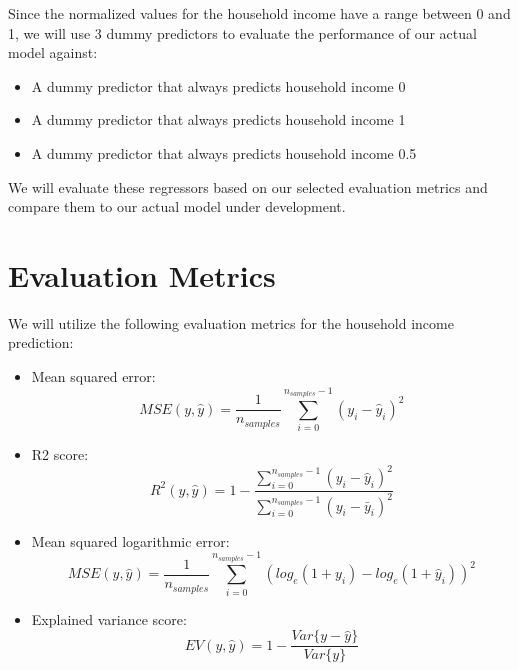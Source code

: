 \documentclass{article}
\begin{document}
Since the normalized values for the household income have a range between 0 and 1, we will use 3 dummy predictors to evaluate the performance of our actual model against:
\begin{itemize}
  \item A dummy predictor that always predicts household income 0
  \item A dummy predictor that always predicts household income 1
  \item A dummy predictor that always predicts household income 0.5
\end{itemize}
We will evaluate these regressors based on our selected evaluation metrics and compare them to our actual model under development.
\hypertarget{metrics}{\section{Evaluation Metrics}}

We will utilize the following evaluation metrics for the household income prediction:
\begin{itemize}
  \item Mean squared error:
    \begin{equation}
      MSE(y, \hat{y}) = \frac{1}{n_{samples}}\sum_{i=0}^{n_{samples} - 1}(y_i - \hat{y}_i)^2
    \end{equation}
  \item R2 score:
    \begin{equation}
      R^2(y, \hat{y}) = 1 - \frac{\sum_{i=0}^{n_{samples} - 1}(y_i - \hat{y}_i)^2}{\sum_{i=0}^{n_{samples} - 1}(y_i - \bar{y}_i)^2}
    \end{equation}
  \item Mean squared logarithmic error:
    \begin{equation}
      MSE(y, \hat{y}) = \frac{1}{n_{samples}}\sum_{i=0}^{n_{samples} - 1}(log_e(1 + y_i) - log_e(1 + \hat{y}_i))^2
    \end{equation}
  \item Explained variance score:
    \begin{equation}
      EV(y, \hat{y}) = 1 - \frac{Var\{y - \hat{y}\}}{Var\{y\}}
    \end{equation}
\end{itemize}
\end{document}
